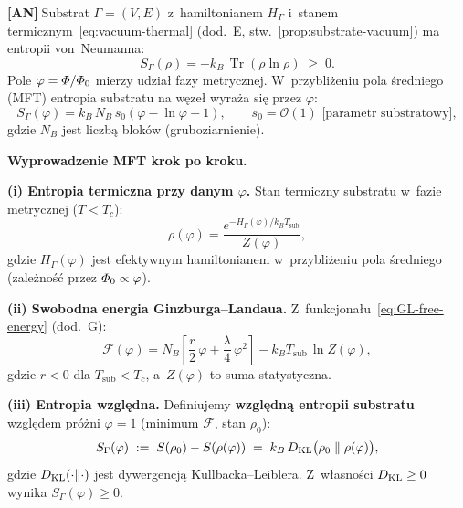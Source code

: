 \begin{chain}\label{chain:A19}
\textbf{[AN]}$\;$Substrat $\Gamma = (V, E)$ z~hamiltonianem
$H_\Gamma$ i~stanem termicznym~\eqref{eq:vacuum-thermal}
(dod.~E, stw.~\ref{prop:substrate-vacuum}) ma entropii
von~Neumanna:
\begin{equation}\label{eq:H-entropy-vonN}
  S_\Gamma(\rho)
  = -k_B\,\operatorname{Tr}(\rho\ln\rho)
  \;\geq\; 0.
\end{equation}
Pole $\varphi = \varPhi/\varPhi_0$ mierzy udzia\l{} fazy metrycznej.
W~przybli\.zeniu pola \'sredniego (MFT) entropia substratu
na w\k{e}ze\l{} wyra\.za si\k{e} przez $\varphi$:
\begin{equation}\label{eq:H-N07}
  \boxed{
  S_\Gamma(\varphi)
  = k_B\,N_B\,s_0\!\left(\varphi - \ln\varphi - 1\right),
  }
  \qquad s_0 = \mathcal{O}(1)\text{ [parametr substratowy]},
\end{equation}
gdzie $N_B$ jest liczb\k{a} blok\'ow (gruboziarnienie).

\medskip
\noindent\textbf{Wyprowadzenie MFT krok po kroku.}

\textbf{(i) Entropia termiczna przy danym $\varphi$.}
Stan termiczny substratu w~fazie metrycznej ($T < T_c$):
\begin{equation}\label{eq:rho-mft}
  \rho(\varphi) = \frac{e^{-H_\Gamma(\varphi)/k_B T_\mathrm{sub}}}
  {Z(\varphi)},
\end{equation}
gdzie $H_\Gamma(\varphi)$ jest efektywnym hamiltonianem
w~przybli\.zeniu pola \'sredniego (zale\.zno\'s\'c przez $\varPhi_0 \propto \varphi$).

\textbf{(ii) Swobodna energia Ginzburga--Landaua.}
Z~funkcjona\l{}u~\eqref{eq:GL-free-energy} (dod.~G):
\begin{equation}\label{eq:F-phi-mft}
  \mathcal{F}(\varphi)
  = N_B\!\left[\frac{r}{2}\,\varphi + \frac{\lambda}{4}\,\varphi^2\right]
  - k_B T_\mathrm{sub}\,\ln Z(\varphi),
\end{equation}
gdzie $r < 0$ dla $T_\mathrm{sub} < T_c$, a~$Z(\varphi)$
to suma statystyczna.

\textbf{(iii) Entropia wzgl\k{e}dna.}
Definiujemy \textbf{wzgl\k{e}dn\k{a} entropii substratu}
wzgl\k{e}dem pr\'o\.zni $\varphi = 1$
(minimum $\mathcal{F}$, stan $\rho_0$):
\begin{equation}\label{eq:S-rel-def}
  S_\Gamma(\varphi) \;:=\; S(\rho_0) - S(\rho(\varphi))
  \;=\; k_B\,D_{\rm KL}\bigl(\rho_0\;\|\;\rho(\varphi)\bigr),
\end{equation}
gdzie $D_{\rm KL}(\cdot\|\cdot)$ jest dywergencj\k{a}
Kullbacka--Leiblera. Z~w\l{}asno\'sci $D_{\rm KL} \geq 0$
wynika $S_\Gamma(\varphi) \geq 0$.


\end{chain}
